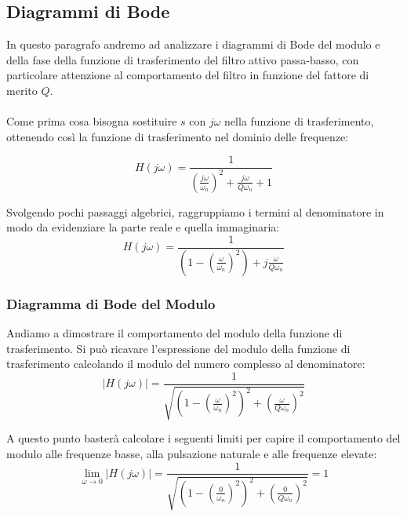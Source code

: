 \subsection{Diagrammi di Bode}
In questo paragrafo andremo ad analizzare i diagrammi di Bode del modulo e della fase della funzione di trasferimento del filtro attivo passa-basso, con particolare attenzione al comportamento del filtro in funzione del fattore di merito $Q$.\\\\
Come prima cosa bisogna sostituire $s$ con $j\omega$ nella funzione di trasferimento, ottenendo così la funzione di trasferimento nel dominio delle frequenze:

\begin{equation}
        H(j\omega) = \frac{1}{\left(\frac{j\omega}{\omega_n}\right)^2 + \frac{j\omega}{Q\omega_n} + 1}
        \label{eq: sostituzione jw LP}
\end{equation}

Svolgendo pochi passaggi algebrici, raggruppiamo i termini al denominatore in modo da evidenziare la parte reale e quella immaginaria:
\begin{equation}
        H(j\omega) = \frac{1}{\left(1-\left(\frac{\omega}{\omega_n}\right)^2\right) + j\frac{\omega}{Q\omega_n}}
        \label{eq: isolare Re e Im LP}
\end{equation}








\subsubsection{Diagramma di Bode del Modulo}

Andiamo a dimostrare il comportamento del modulo della funzione di trasferimento. Si può ricavare l'espressione del modulo della funzione di trasferimento calcolando il modulo del numero complesso al denominatore:
\begin{equation}
    |H(j\omega)| = \frac{1}{\sqrt{\left(1-\left(\frac{\omega}{\omega_n}\right)^2\right)^2 + \left(\frac{\omega}{Q\omega_n}\right)^2}}
    \label{eq: modulo LP}
\end{equation}


A questo punto basterà calcolare i seguenti limiti per capire il comportamento del modulo alle frequenze basse, alla pulsazione naturale e alle frequenze elevate:
\begin{equation}
    \lim_{\omega \to 0} |H(j\omega)| = \frac{1}{\sqrt{\left(1-\left(\frac{0}{\omega_n}\right)^2\right)^2 + \left(\frac{0}{Q\omega_n}\right)^2}} = 1
    \label{eq: lim w 0 LP}
\end{equation}


